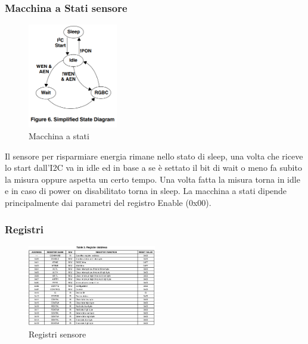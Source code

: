 \documentclass[a4paper,12pt]{report}
\begin{document}
\subsubsection{Macchina a Stati sensore}
\begin{figure}[h]
    \centering
    \includegraphics[width=0.35\textwidth]{images/Immagini sensore/macchina a stati.png}
    \caption{Macchina a stati}
\end{figure}
Il sensore per risparmiare energia rimane nello stato di sleep, una volta che riceve lo start dall'I2C va in idle ed in base a se è settato il bit di wait o meno fa subito la misura oppure aspetta un certo tempo. Una volta fatta la misura torna in idle e in caso di power on disabilitato torna in sleep. La macchina a stati dipende principalmente dai parametri del registro Enable (0x00).
\clearpage
\subsubsection{Registri}
\begin{figure}[h]
    \centering
    \includegraphics[width=0.5\textwidth]{images/Immagini sensore/Indirizzi sensore.png}
    \caption{Registri sensore}
\end{figure} 
\end{document}

